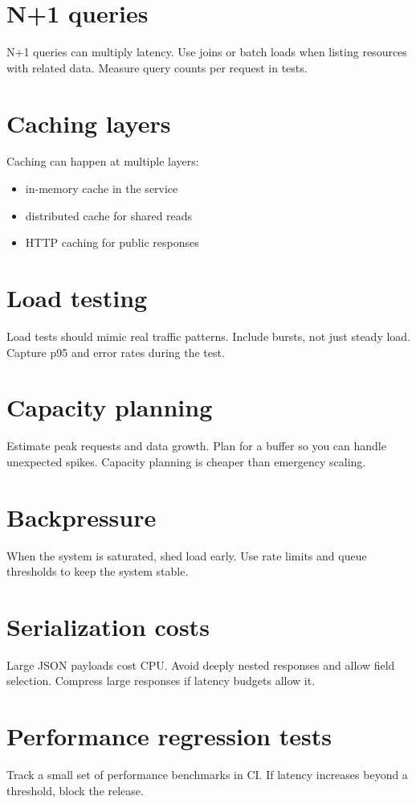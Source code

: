 \section{N+1 queries}
N+1 queries can multiply latency.
Use joins or batch loads when listing resources with related data.
Measure query counts per request in tests.

\section{Caching layers}
Caching can happen at multiple layers:
\begin{itemize}[nosep]
  \item in-memory cache in the service
  \item distributed cache for shared reads
  \item HTTP caching for public responses
\end{itemize}

\section{Load testing}
Load tests should mimic real traffic patterns.
Include bursts, not just steady load.
Capture p95 and error rates during the test.

\section{Capacity planning}
Estimate peak requests and data growth.
Plan for a buffer so you can handle unexpected spikes.
Capacity planning is cheaper than emergency scaling.

\section{Backpressure}
When the system is saturated, shed load early.
Use rate limits and queue thresholds to keep the system stable.

\section{Serialization costs}
Large JSON payloads cost CPU.
Avoid deeply nested responses and allow field selection.
Compress large responses if latency budgets allow it.

\section{Performance regression tests}
Track a small set of performance benchmarks in CI.
If latency increases beyond a threshold, block the release.

